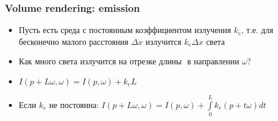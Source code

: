 \documentclass{beamer}
\begin{document}
\begin{frame}[fragile]
\frametitle{Volume rendering: emission}
\begin{itemize}
\item Пусть есть среда с постоянным коэффициентом излучения \begin{math}k_e\end{math}, т.е. для бесконечно малого расстояния \begin{math}\Delta x\end{math} излучится \begin{math}k_e \Delta x\end{math} света
\pause
\item Как много света излучится на отрезке длины \begin{math}[p, p + L\omega]\end{math} в направлении \begin{math}\omega\end{math}?
\pause
\item \begin{math}I(p+L\omega,\omega) = I(p,\omega) + k_e L\end{math}
\pause
\item Если \begin{math}k_e\end{math} не постоянна: \begin{math}I(p+L\omega,\omega) = I(p,\omega) + \int\limits_0^L k_e(p+t\omega)dt\end{math}
\end{itemize}
\end{frame}
\end{document}
